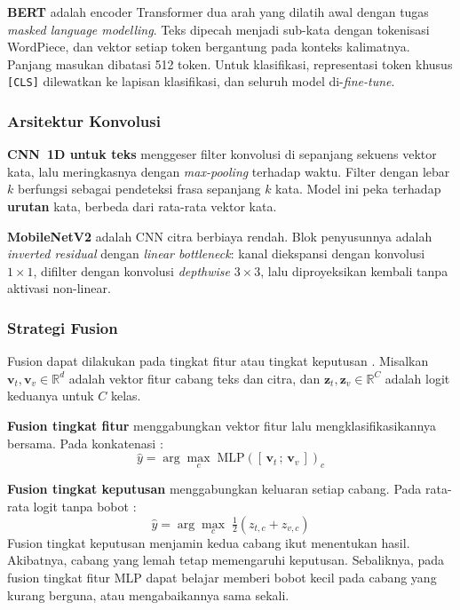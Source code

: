 \textbf{BERT} \parencite{devlin2019} adalah encoder Transformer dua arah yang dilatih awal
dengan tugas \textit{masked language modelling}. Teks dipecah menjadi sub-kata dengan
tokenisasi WordPiece, dan vektor setiap token bergantung pada konteks kalimatnya.
Panjang masukan dibatasi 512 token. Untuk klasifikasi, representasi token khusus
\texttt{[CLS]} dilewatkan ke lapisan klasifikasi, dan seluruh model di-\textit{fine-tune}.

\subsubsection{Arsitektur Konvolusi}

\textbf{CNN~1D untuk teks} \parencite{kim2014} menggeser filter konvolusi di sepanjang
sekuens vektor kata, lalu meringkasnya dengan \textit{max-pooling} terhadap waktu. Filter
dengan lebar $k$ berfungsi sebagai pendeteksi frasa sepanjang $k$ kata. Model ini peka
terhadap \textbf{urutan} kata, berbeda dari rata-rata vektor kata.

\textbf{MobileNetV2} \parencite{sandler2018} adalah CNN citra berbiaya rendah. Blok
penyusunnya adalah \textit{inverted residual} dengan \textit{linear bottleneck}: kanal
diekspansi dengan konvolusi $1\times1$, difilter dengan konvolusi \textit{depthwise}
$3\times3$, lalu diproyeksikan kembali tanpa aktivasi non-linear.

\subsubsection{Strategi Fusion}

Fusion dapat dilakukan pada tingkat fitur atau tingkat keputusan
\parencite{baltrusaitis2019}. Misalkan $\mathbf{v}_t, \mathbf{v}_v \in \mathbb{R}^{d}$
adalah vektor fitur cabang teks dan citra, dan $\mathbf{z}_t, \mathbf{z}_v \in
\mathbb{R}^{C}$ adalah logit keduanya untuk $C$ kelas.

\textbf{Fusion tingkat fitur} menggabungkan vektor fitur lalu mengklasifikasikannya
bersama. Pada konkatenasi \parencite{audebert2020}:
\begin{equation}\label{eq:concat}
  \hat{y} = \arg\max_c \; \mathrm{MLP}\!\left([\,\mathbf{v}_t \,;\, \mathbf{v}_v\,]\right)_c
\end{equation}

\textbf{Fusion tingkat keputusan} menggabungkan keluaran setiap cabang. Pada rata-rata
logit tanpa bobot \parencite{kashyap2026}:
\begin{equation}\label{eq:logit}
  \hat{y} = \arg\max_c \; \tfrac{1}{2}\left(z_{t,c} + z_{v,c}\right)
\end{equation}
Fusion tingkat keputusan menjamin kedua cabang ikut menentukan hasil. Akibatnya, cabang
yang lemah tetap memengaruhi keputusan. Sebaliknya, pada fusion tingkat fitur MLP dapat
belajar memberi bobot kecil pada cabang yang kurang berguna, atau mengabaikannya sama
sekali.

